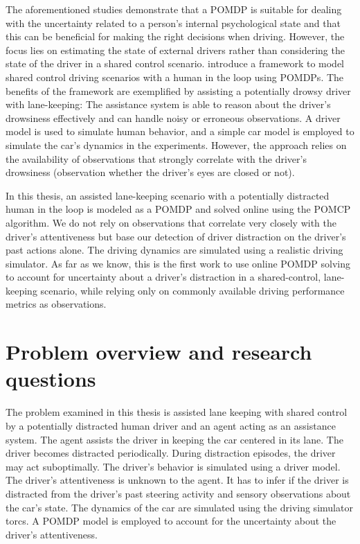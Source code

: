 The aforementioned studies demonstrate that a POMDP is suitable for dealing with the uncertainty related to a person's internal psychological state and that this can be beneficial for making the right decisions when driving. However, the focus lies on estimating the state of external drivers rather than considering the state of the driver in a shared control scenario. \cite{hitl_pomdp} introduce a framework to model shared control driving scenarios with a human in the loop using POMDPs. The benefits of the framework are exemplified by assisting a potentially drowsy driver with lane-keeping: The assistance system is able to reason about the driver's drowsiness effectively and can handle noisy or erroneous observations. A driver model is used to simulate human behavior, and a simple car model is employed to simulate the car's dynamics in the experiments. However, the approach relies on the availability of observations that strongly correlate with the driver's drowsiness (observation whether the driver's eyes are closed or not).

In this thesis, an assisted lane-keeping scenario with a potentially distracted human in the loop is modeled as a POMDP and solved online using the POMCP algorithm. We do not rely on observations that correlate very closely with the driver's attentiveness but base our detection of driver distraction on the driver's past actions alone. The driving dynamics are simulated using a realistic driving simulator. As far as we know, this is the first work to use online POMDP solving to account for uncertainty about a driver's distraction in a shared-control, lane-keeping scenario, while relying only on commonly available driving performance metrics as observations.

\section{Problem overview and research questions}

The problem examined in this thesis is assisted lane keeping with shared control by a potentially distracted human driver and an agent acting as an assistance system. The agent assists the driver in keeping the car centered in its lane. The driver becomes distracted periodically. During distraction episodes, the driver may act suboptimally. The driver's behavior is simulated using a driver model. The driver’s attentiveness is unknown to the agent. It has to infer if the driver is distracted from the driver's past steering activity and sensory observations about the car's state. The dynamics of the car are simulated using the driving simulator \Gls{torcs}. A POMDP model is employed to account for the uncertainty about the driver's attentiveness.

